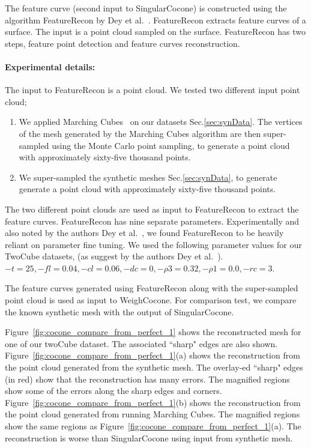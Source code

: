 The feature curve (second input to SingularCocone) is constructed using the algorithm FeatureRecon by Dey et al.~\cite{Dey2013}. FeatureRecon extracts feature curves of a surface. The input is a point cloud sampled on the surface. FeatureRecon has two steps, feature point detection and feature curves reconstruction. 
\paragraph{Experimental details:} The input to FeatureRecon is a point cloud. We tested two different input point cloud;
\begin{enumerate}
	\item We applied Marching Cubes~\cite{lc-mchr3-87} on our datasets Sec.\ref{sec:synData}. The vertices of the mesh generated by the Marching Cubes algorithm are then super-sampled using the Monte Carlo point sampling, to generate a point cloud with approximately sixty-five thousand points.
	\item We super-sampled the synthetic meshes Sec.\ref{sec:synData}, to generate generate a point cloud with approximately sixty-five thousand points.
\end{enumerate}
The two different point clouds are used as input to FeatureRecon to extract the feature curves. 
FeatureRecon has nine separate parameters. Experimentally and also noted by the authors Dey et al.~\cite{Dey2013}, we found FeatureRecon to be heavily reliant on parameter fine tuning. We used the following parameter values for our TwoCube datasets, (as suggest by the authors Dey et al.~\cite{Dey2013}). 
$-t = 25,-fl = 0.04, -cl = 0.06, -dc = 0, -\rho3 = 0.32, -\rho1 = 0.0, -rc = 3$.

The feature curves generated using FeatureRecon along with the super-sampled point cloud is used as input to WeighCocone. For comparison test, we compare the known synthetic mesh with the output of SingularCocone.

Figure~\ref{fig:cocone_compare_from_perfect_1} shows the reconstructed mesh for one of our twoCube dataset. The associated ``sharp" edges are also shown. Figure~\ref{fig:cocone_compare_from_perfect_1}(a) shows the reconstruction from the point cloud generated from the synthetic mesh. The overlay-ed ``sharp" edges (in red) show that the reconstruction has many errors. The magnified regions show some of the errors along the sharp edges and corners. Figure~\ref{fig:cocone_compare_from_perfect_1}(b) shows the reconstruction from the point cloud generated from running Marching Cubes. The magnified regions show the same regions as Figure~\ref{fig:cocone_compare_from_perfect_1}(a). The reconstruction is worse than SingularCocone using input from synthetic mesh. 


